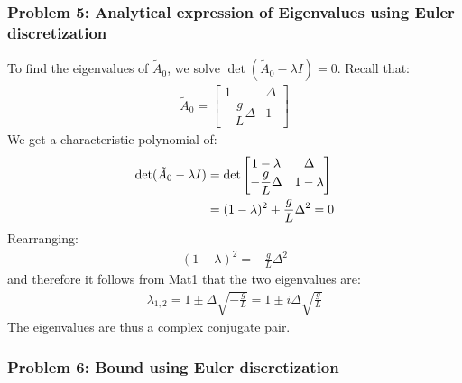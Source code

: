 \documentclass[12pt,twoside]{article}
\begin{document}
\subsubsection*{{\color{red}Problem 5: Analytical expression of Eigenvalues using Euler discretization}}

To find the eigenvalues of $\tilde{A}_0$, we solve $\det(\tilde{A}_0 - \lambda I) = 0$.
Recall that:
\begin{align}
    \tilde{A}_0 = \begin{bmatrix} 1 & \Delta \\ -\dfrac{g}{L}\Delta & 1 \end{bmatrix}
\end{align}
We get a characteristic polynomial of:
\begin{align}
    \det(\tilde{A}_0 - \lambda I) &= \det\begin{bmatrix} 1-\lambda & \Delta \\ -\dfrac{g}{L}\Delta & 1-\lambda \end{bmatrix} \notag \\
    &= (1-\lambda)^2 + \frac{g}{L}\Delta^2 = 0
\end{align}
Rearranging:
\begin{align}
    (1-\lambda)^2 = -\frac{g}{L}\Delta^2
\end{align}
and therefore it follows from Mat1 that the two eigenvalues are:
\begin{align}
    \lambda_{1,2} = 1 \pm \Delta\sqrt{-\frac{g}{L}} = 1 \pm i\Delta\sqrt{\frac{g}{L}}
\end{align}
The eigenvalues are thus a complex conjugate pair.

\subsubsection*{{\color{red}Problem 6: Bound using Euler discretization}}
\end{document}

